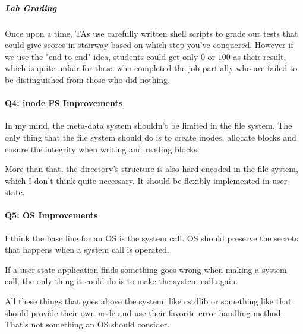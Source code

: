 \documentclass[
]{article}
\begin{document}
\hypertarget{header-n147}{%
\subparagraph{Lab Grading}\label{header-n147}}

Once upon a time, TAs use carefully written shell scripts to grade our
tests that could give scores in stairway based on which step you've
conquered. However if we use the "end-to-end" idea, students could get
only \(0\) or \(100\) as their result, which is quite unfair for those
who completed the job partially who are failed to be distinguished from
those who did nothing.

\hypertarget{header-n152}{%
\paragraph{Q4: inode FS Improvements}\label{header-n152}}

In my mind, the meta-data system shouldn't be limited in the file
system. The only thing that the file system should do is to create
inodes, allocate blocks and ensure the integrity when writing and
reading blocks.

More than that, the directory's structure is also hard-encoded in the
file system, which I don't think quite necessary. It should be flexibly
implemented in user state.

\hypertarget{header-n159}{%
\paragraph{Q5: OS Improvements}\label{header-n159}}

I think the base line for an OS is the system call. OS should preserve
the secrets that happens when a system call is operated.

If a user-state application finds something goes wrong when making a
system call, the only thing it could do is to make the system call
again.

All these things that goes above the system, like cstdlib or something
like that should provide their own node and use their favorite error
handling method. That's not something an OS should consider.
\end{document}
